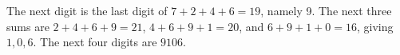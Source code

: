 The next digit is the last digit of $7+2+4+6=19$, namely 9. The next three sums are $2+4+6+9=21$, $4+6+9+1=20$, and $6+9+1+0=16$, giving $1,0,6$. The next four digits are $\boxed{9106}$.
